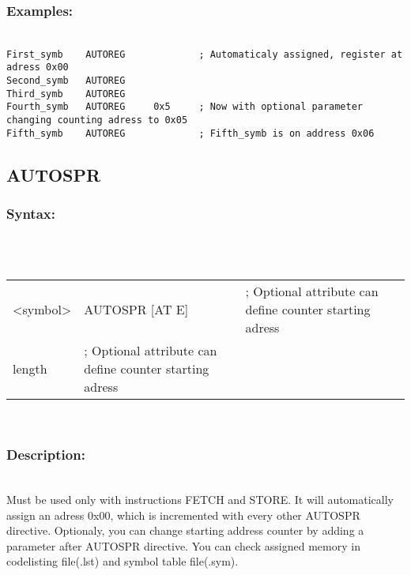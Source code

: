         \subsubsection{Examples:}
            {
                ~\\
                \usecodefont
                \verb'First_symb    AUTOREG             ; Automaticaly assigned, register at adress 0x00'\\
                \verb'Second_symb   AUTOREG'\\
                \verb'Third_symb    AUTOREG'\\
                \verb'Fourth_symb   AUTOREG     0x5     ; Now with optional parameter changing counting adress to 0x05'\\
                \verb'Fifth_symb    AUTOREG             ; Fifth_symb is on address 0x06'\\
            }
            
    \subsection{AUTOSPR}
        \subsubsection{Syntax:}\\
                    \\ {
                            \texttt{}
                            \begin{tabular}[h!]{llll}
                            { \color{highlight_symbol} <symbol> }  &
                            { \color{highlight_directive} AUTOSPR }
                            { \color{highlight_constant} [AT E] } & { \color{highlight_comment} ; Optional attribute can define
                                                                                                counter starting adress }\\
                            { \color{highlight_constant} length } & { \color{highlight_comment} ; Optional attribute can define
                                                                                                counter starting adress }\\
                            \end{tabular}
                    }
                    \\
    \subsubsection{Description:}\\
    Must be used only with instructions FETCH and STORE. It will automatically assign an
    adress 0x00, which is incremented with every other AUTOSPR directive. Optionaly, you can change starting address counter by adding a parameter
    after AUTOSPR directive. You can check assigned memory in codelisting file(.lst) and symbol table file(.sym).

